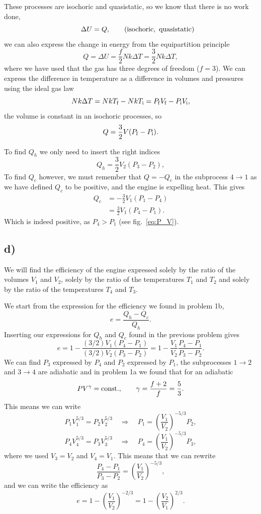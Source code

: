 \documentclass[a4paper, 11pt, titlepage, english]{article}
\begin{document}
These processes are isochoric and quasistatic, so we know that there is no work done,
$$\qquad \Delta U = Q, \qquad (\rm isochoric,\ quasistatic)$$ 
we can also express the change in energy from the equipartition principle 
$$Q = \Delta U = \frac{f}{2}Nk\Delta T = \frac{3}{2}Nk\Delta T,$$
where we have used that the gas has three degrees of freedom ($f=3$). We can express the difference in temperature as a difference in volumes and pressures using the ideal gas law
$$Nk\Delta T = NkT_{\rm f} - NkT_{\rm i} = P_{\rm f}V_{\rm f} - P_{\rm i}V_{\rm i},$$
the volume is constant in an isochoric processes, so
$$Q = \frac{3}{2}V(P_{\rm f} - P_{\rm i}).$$

To find $Q_h$ we only need to insert the right indices
$$Q_h = \frac{3}{2}V_2(P_3 - P_2),$$
To find $Q_c$ however, we must remember that $Q = -Q_c$ in the subprocess $4\rightarrow1$ as we have defined $Q_c$ to be positive, and the engine is expelling heat. This gives
\begin{align*}
Q_c &= -\frac{3}{2}V_1(P_1 - P_4) \\
&= \frac{3}{2}V_1(P_4 - P_1).
\end{align*}
Which is indeed positive, as $P_4 > P_1$ (see fig.\ \ref{eq:P_V}).

\subsection*{d)}
We will find the efficiency of the engine expressed solely by the ratio of the volumes $V_1$ and $V_2$, solely by the ratio of the temperatures $T_1$ and $T_2$ and solely by the ratio of the temperatures $T_4$ and $T_3$.

We start from the expression for the efficiency we found in problem 1b,
$$e = \frac{Q_h - Q_c}{Q_h}.$$
Inserting our expressions for $Q_h$ and $Q_c$ found in the previous problem gives
$$e = 1 - \frac{(3/2)V_1(P_4 - P_1)}{(3/2)V_2(P_3 - P_2)} = 1 - \frac{V_1}{V_2} \frac{P_4 - P_1}{P_3-P_2}.$$
We can find $P_3$ expressed by $P_4$ and $P_2$ expressed by $P_1$, the subprocesses $1\rightarrow2$ and $3\rightarrow4$ are adiabatic and in problem 1a we found that for an adiabatic
$$PV^\gamma = {\rm const.}, \qquad \gamma = \frac{f+2}{f} = \frac{5}{3}.$$
This means we can write
$$P_1V_1^{5/3} = P_2V_2^{5/3} \quad \Rightarrow \quad P_1 = \left(\frac{V_1}{V_2}\right)^{-5/3}P_2,$$
$$P_4V_4^{5/3} = P_3V_3^{5/3} \quad \Rightarrow \quad P_4 = \left(\frac{V_1}{V_2}\right)^{-5/3}P_3,$$
where we used $V_3 = V_2$ and $V_4 = V_1$. This means that we can rewrite
$$\frac{P_4 - P_1}{P_3 - P_2} = \left(\frac{V_1}{V_2}\right)^{-5/3},$$
and we can write the efficiency as
$$e = 1 - \left(\frac{V_1}{V_2}\right)^{-2/3} = 1 - \left(\frac{V_2}{V_1}\right)^{2/3}.$$
\end{document}

